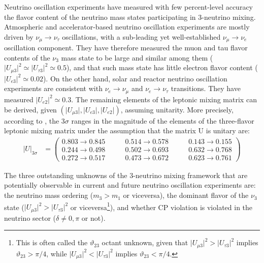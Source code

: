Neutrino oscillation experiments have measured with few percent-level accuracy the flavor content of the neutrino mass states participating in 3-neutrino mixing. Atmospheric and accelerator-based neutrino oscillation experiments are mostly driven by $\nu_{\mu}\to\nu_{\tau}$ oscillations, with a sub-leading yet well-established $\nu_{\mu}\to\nu_{e}$ oscillation component.  They have therefore measured the muon and tau flavor contents of the $\nu_3$ mass state to be large and similar among them ($\lvert U_{\mu 3}\rvert^2\simeq \lvert U_{\tau 3}\rvert^2\simeq 0.5$), and that such mass state has little electron flavor content ($\lvert U_{e3}\rvert^2\simeq 0.02$). On the other hand, solar and reactor neutrino oscillation experiments are consistent with $\nu_e\to\nu_{\mu}$ and $\nu_e\to\nu_{\tau}$ transitions. They have measured $\lvert U_{e2}\rvert^2\simeq 0.3$. The remaining elements of the leptonic mixing matrix can  be derived, given $(\lvert U_{\mu 3}\rvert,\lvert U_{e3}\rvert,\lvert U_{e2}\rvert)$, assuming unitarity. More precisely, according to \cite{Esteban:2020cvm}, the 3$\sigma$ ranges in the magnitude of the elements of the three-flavor leptonic mixing matrix under the assumption that the matrix U is unitary are:
\begin{equation}
  \label{eq:umatrix}
  \begin{aligned}
    \lvert U\rvert_{3\sigma} &=
    \begin{pmatrix}
      0.803 \to 0.845 &\qquad
      0.514 \to 0.578 &\qquad
      0.143 \to 0.155
      \\
      0.244 \to 0.498 &\qquad
      0.502 \to 0.693 &\qquad
      0.632 \to 0.768
      \\
      0.272 \to 0.517 &\qquad
      0.473 \to 0.672 &\qquad
      0.623 \to 0.761
    \end{pmatrix}
  \end{aligned}
\end{equation}
%

The three outstanding unknowns of the 3-neutrino mixing framework that are potentially observable in current and future neutrino oscillation experiments are: the neutrino mass ordering ($m_3>m_1$ or viceversa), the dominant flavor of the $\nu_3$ state ($\lvert U_{\mu 3}\rvert^2 > \lvert U_{\tau 3}\rvert^2$ or viceversa\footnote{This is often called the $\vartheta_{23}$ octant unknown, given that $\lvert U_{\mu 3}\rvert^2 > \lvert U_{\tau 3}\rvert^2$ implies $\vartheta_{23}>\pi/4$, while $\lvert U_{\mu 3}\rvert^2 < \lvert U_{\tau 3}\rvert^2$ implies $\vartheta_{23}<\pi/4$.}), and whether CP violation is violated in the neutrino sector ($\delta\neq 0,\pi$ or not).

